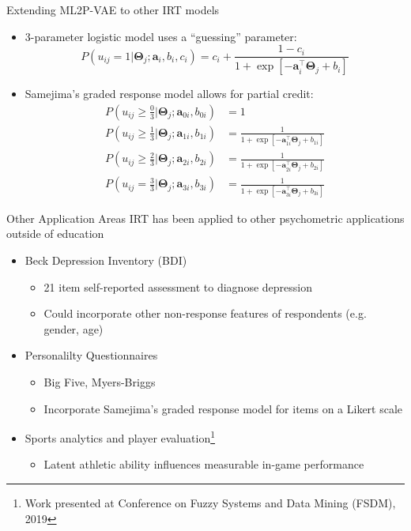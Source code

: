 \documentclass{beamer}
\newcommand{\vect}[1]{\boldsymbol{#1}}
\theoremstyle{definition}
\begin{document}
\begin{frame}{Extending ML2P-VAE to other IRT models}
  \begin{itemize}
    \item 3-parameter logistic model uses a ``guessing'' parameter:
      \[P(u_{ij} = 1 | \vect \Theta_j; \vect a_i, b_i, c_i) = c_i + \frac{1-c_i}{1 + \exp\left[-\vect a_i^\top \vect \Theta_j + b_i \right]}\]
    \item<2-> Samejima's graded response model allows for partial credit:
      {\small
      \begin{align*}
        P(u_{ij} \geq \frac{0}{3} | \vect \Theta_j; \vect a_{0i}, b_{0i}) &= 1\\
        P(u_{ij} \geq \frac{1}{3} | \vect \Theta_j; \vect a_{1i}, b_{1i}) &= \frac{1}{1 + \exp\left[-\vect a_{1i}^\top \vect \Theta_j + b_{1i} \right]} \\ 
        P(u_{ij} \geq \frac{2}{3} | \vect \Theta_j; \vect a_{2i}, b_{2i}) &= \frac{1}{1 + \exp\left[-\vect a_{2i}^\top \vect \Theta_j + b_{2i} \right]} \\ 
        P(u_{ij} = \frac{3}{3} | \vect \Theta_j; \vect a_{3i}, b_{3i}) &= \frac{1}{1 + \exp\left[-\vect a_{3i}^\top \vect \Theta_j + b_{3i} \right]} 
      \end{align*}
    }
  \end{itemize}
\end{frame}

\begin{frame}{Other Application Areas}
    IRT has been applied to other psychometric applications outside of education
      \begin{itemize}
        \item Beck Depression Inventory (BDI)
          \begin{itemize}
            \item 21 item self-reported assessment to diagnose depression
            \item Could incorporate other non-response features of respondents (e.g. gender, age)
          \end{itemize}
        \item<2-> Personalilty Questionnaires
          \begin{itemize}
            \item Big Five, Myers-Briggs
            \item Incorporate Samejima's graded response model for items on a Likert scale
          \end{itemize}
        \item<3-> Sports analytics and player evaluation\footnote{Work presented at Conference on Fuzzy Systems and Data Mining (FSDM), 2019}
          \begin{itemize}
            \item Latent athletic ability influences measurable in-game performance
          \end{itemize}
      \end{itemize}
\end{frame}
\end{document}
